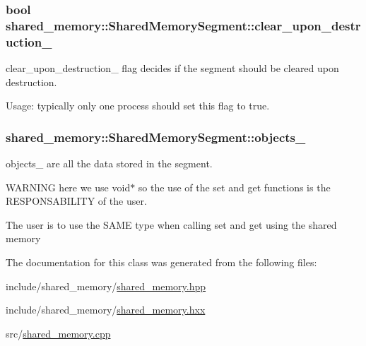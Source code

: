 \subsubsection[{\texorpdfstring{clear\+\_\+upon\+\_\+destruction\+\_\+}{clear_upon_destruction_}}]{\setlength{\rightskip}{0pt plus 5cm}bool shared\+\_\+memory\+::\+Shared\+Memory\+Segment\+::clear\+\_\+upon\+\_\+destruction\+\_\+\hspace{0.3cm}{\ttfamily [private]}}\hypertarget{classshared__memory_1_1SharedMemorySegment_af50ac70dca284926b15803f86958b220}{}\label{classshared__memory_1_1SharedMemorySegment_af50ac70dca284926b15803f86958b220}


clear\+\_\+upon\+\_\+destruction\+\_\+ flag decides if the segment should be cleared upon destruction. 

Usage\+: typically only one process should set this flag to true. 
\subsubsection[{\texorpdfstring{objects\+\_\+}{objects_}}]{ shared\+\_\+memory\+::\+Shared\+Memory\+Segment\+::objects\+\_\+\hspace{0.3cm}{\ttfamily [private]}}\hypertarget{classshared__memory_1_1SharedMemorySegment_a8c4d0eb6f2a620bf7e5b22a57c07380b}{}\label{classshared__memory_1_1SharedMemorySegment_a8c4d0eb6f2a620bf7e5b22a57c07380b}


objects\+\_\+ are all the data stored in the segment. 

W\+A\+R\+N\+I\+NG here we use void$\ast$ so the use of the set and get functions is the R\+E\+S\+P\+O\+N\+S\+A\+B\+I\+L\+I\+TY of the user.

The user is to use the S\+A\+ME type when calling set and get using the shared memory 

The documentation for this class was generated from the following files\+:\begin{DoxyCompactItemize}
\item 
include/shared\+\_\+memory/\hyperlink{shared__memory_8hpp}{shared\+\_\+memory.\+hpp}\item 
include/shared\+\_\+memory/\hyperlink{shared__memory_8hxx}{shared\+\_\+memory.\+hxx}\item 
src/\hyperlink{shared__memory_8cpp}{shared\+\_\+memory.\+cpp}\end{DoxyCompactItemize}
